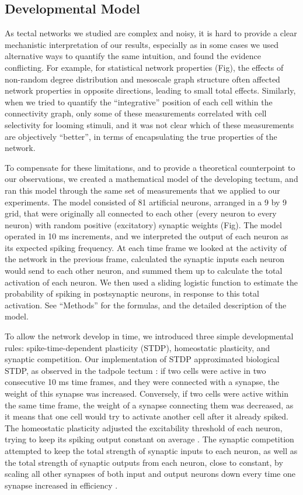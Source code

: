 \documentclass{article}
\begin{document}
\subsection*{Developmental Model}

As tectal networks we studied are complex and noisy, it is hard to provide a clear mechanistic interpretation of our results, especially as in some cases we used alternative ways to quantify the same intuition, and found the evidence conflicting. For example, for statistical network properties (Fig), the effects of non-random degree distribution and mesoscale graph structure often affected network properties in opposite directions, leading to small total effects. Similarly, when we tried to quantify the “integrative” position of each cell within the connectivity graph, only some of these measurements correlated with cell selectivity for looming stimuli, and it was not clear which of these measurements are objectively “better”, in terms of encapsulating the true properties of the network.

To compensate for these limitations, and to provide a theoretical counterpoint to our observations, we created a mathematical model of the developing tectum, and ran this model through the same set of measurements that we applied to our experiments. The model consisted of 81 artificial neurons, arranged in a 9 by 9 grid, that were originally all connected to each other (every neuron to every neuron) with random positive (excitatory) synaptic weights (Fig). The model operated in 10 ms increments, and we interpreted the output of each neuron as its expected spiking frequency. At each time frame we looked at the activity of the network in the previous frame, calculated the synaptic inputs each neuron would send to each other neuron, and summed them up to calculate the total activation of each neuron. We then used a sliding logistic function to estimate the probability of spiking in postsynaptic neurons, in response to this total activation. See “Methods” for the formulas, and the detailed description of the model.

To allow the network develop in time, we introduced three simple developmental rules: spike-time-dependent plasticity (STDP), homeostatic plasticity, and synaptic competition. Our implementation of STDP approximated biological STDP, as observed in the tadpole tectum \citep{zhang1998stdp,mu2006stdp}: if two cells were active in two consecutive 10 ms time frames, and they were connected with a synapse, the weight of this synapse was increased. Conversely, if two cells were active within the same time frame, the weight of a synapse connecting them was decreased, as it means that one cell would try to activate another cell after it already spiked. The homeostatic plasticity adjusted the excitability threshold of each neuron, trying to keep its spiking output constant on average \citep{pratt2007intrinsic,turrigiano2011}. The synaptic competition attempted to keep the total strength of synaptic inputs to each neuron, as well as the total strength of synaptic outputs from each neuron, close to constant, by scaling all other synapses of both input and output neurons down every time one synapse increased in efficiency \citep{hamodi2016nmda,cohen2002synreview,munz2014hebbian}.
\end{document}
